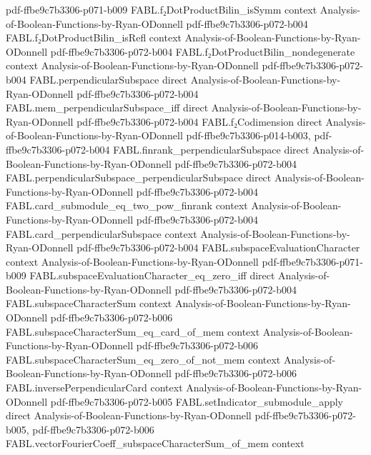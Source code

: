 \begin{theorem}
  {pdf-ffbe9c7b3306-p071-b009}
\proofstep
  {FABL.f₂DotProductBilin_isSymm}
  {context}
  {Analysis-of-Boolean-Functions-by-Ryan-ODonnell}
  {pdf-ffbe9c7b3306-p072-b004}
\proofstep
  {FABL.f₂DotProductBilin_isRefl}
  {context}
  {Analysis-of-Boolean-Functions-by-Ryan-ODonnell}
  {pdf-ffbe9c7b3306-p072-b004}
\proofstep
  {FABL.f₂DotProductBilin_nondegenerate}
  {context}
  {Analysis-of-Boolean-Functions-by-Ryan-ODonnell}
  {pdf-ffbe9c7b3306-p072-b004}
\proofstep
  {FABL.perpendicularSubspace}
  {direct}
  {Analysis-of-Boolean-Functions-by-Ryan-ODonnell}
  {pdf-ffbe9c7b3306-p072-b004}
\proofstep
  {FABL.mem_perpendicularSubspace_iff}
  {direct}
  {Analysis-of-Boolean-Functions-by-Ryan-ODonnell}
  {pdf-ffbe9c7b3306-p072-b004}
\proofstep
  {FABL.f₂Codimension}
  {direct}
  {Analysis-of-Boolean-Functions-by-Ryan-ODonnell}
  {pdf-ffbe9c7b3306-p014-b003,
    pdf-ffbe9c7b3306-p072-b004}
\proofstep
  {FABL.finrank_perpendicularSubspace}
  {direct}
  {Analysis-of-Boolean-Functions-by-Ryan-ODonnell}
  {pdf-ffbe9c7b3306-p072-b004}
\proofstep
  {FABL.perpendicularSubspace_perpendicularSubspace}
  {direct}
  {Analysis-of-Boolean-Functions-by-Ryan-ODonnell}
  {pdf-ffbe9c7b3306-p072-b004}
\proofstep
  {FABL.card_submodule_eq_two_pow_finrank}
  {context}
  {Analysis-of-Boolean-Functions-by-Ryan-ODonnell}
  {pdf-ffbe9c7b3306-p072-b004}
\proofstep
  {FABL.card_perpendicularSubspace}
  {context}
  {Analysis-of-Boolean-Functions-by-Ryan-ODonnell}
  {pdf-ffbe9c7b3306-p072-b004}
\proofstep
  {FABL.subspaceEvaluationCharacter}
  {context}
  {Analysis-of-Boolean-Functions-by-Ryan-ODonnell}
  {pdf-ffbe9c7b3306-p071-b009}
\proofstep
  {FABL.subspaceEvaluationCharacter_eq_zero_iff}
  {direct}
  {Analysis-of-Boolean-Functions-by-Ryan-ODonnell}
  {pdf-ffbe9c7b3306-p072-b004}
\proofstep
  {FABL.subspaceCharacterSum}
  {context}
  {Analysis-of-Boolean-Functions-by-Ryan-ODonnell}
  {pdf-ffbe9c7b3306-p072-b006}
\proofstep
  {FABL.subspaceCharacterSum_eq_card_of_mem}
  {context}
  {Analysis-of-Boolean-Functions-by-Ryan-ODonnell}
  {pdf-ffbe9c7b3306-p072-b006}
\proofstep
  {FABL.subspaceCharacterSum_eq_zero_of_not_mem}
  {context}
  {Analysis-of-Boolean-Functions-by-Ryan-ODonnell}
  {pdf-ffbe9c7b3306-p072-b006}
\proofstep
  {FABL.inversePerpendicularCard}
  {context}
  {Analysis-of-Boolean-Functions-by-Ryan-ODonnell}
  {pdf-ffbe9c7b3306-p072-b005}
\proofstep
  {FABL.setIndicator_submodule_apply}
  {direct}
  {Analysis-of-Boolean-Functions-by-Ryan-ODonnell}
  {pdf-ffbe9c7b3306-p072-b005,
    pdf-ffbe9c7b3306-p072-b006}
\proofstep
  {FABL.vectorFourierCoeff_subspaceCharacterSum_of_mem}
  {context}

\end{theorem}
